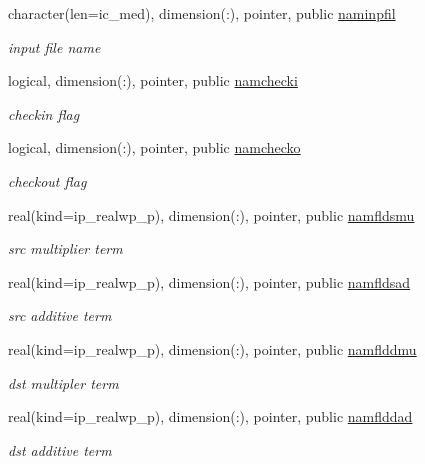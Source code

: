\begin{DoxyCompactItemize}
character(len=ic\+\_\+med), dimension(\+:), pointer, public \hyperlink{namespacemod__oasis__namcouple_a15fc11ff1c1d5718ff127a06a205a82c}{naminpfil}
\begin{DoxyCompactList}\small\item\em input file name \end{DoxyCompactList}\item 
logical, dimension(\+:), pointer, public \hyperlink{namespacemod__oasis__namcouple_a7c88a329c97aea020e9b135bdca8d160}{namchecki}
\begin{DoxyCompactList}\small\item\em checkin flag \end{DoxyCompactList}\item 
logical, dimension(\+:), pointer, public \hyperlink{namespacemod__oasis__namcouple_a58c011820e55c9af9f306fbb1d45eb23}{namchecko}
\begin{DoxyCompactList}\small\item\em checkout flag \end{DoxyCompactList}\item 
real(kind=ip\+\_\+realwp\+\_\+p), dimension(\+:), pointer, public \hyperlink{namespacemod__oasis__namcouple_ab52824ec91491253e02556a68ab31b09}{namfldsmu}
\begin{DoxyCompactList}\small\item\em src multiplier term \end{DoxyCompactList}\item 
real(kind=ip\+\_\+realwp\+\_\+p), dimension(\+:), pointer, public \hyperlink{namespacemod__oasis__namcouple_a1729dba99742412a1e07a479cb7f7921}{namfldsad}
\begin{DoxyCompactList}\small\item\em src additive term \end{DoxyCompactList}\item 
real(kind=ip\+\_\+realwp\+\_\+p), dimension(\+:), pointer, public \hyperlink{namespacemod__oasis__namcouple_ad81bb4f19a71f0fcf8655cb9d39a3380}{namflddmu}
\begin{DoxyCompactList}\small\item\em dst multipler term \end{DoxyCompactList}\item 
real(kind=ip\+\_\+realwp\+\_\+p), dimension(\+:), pointer, public \hyperlink{namespacemod__oasis__namcouple_af1e31f45ea1cd7a7b64a8a7dc2cec4ee}{namflddad}
\begin{DoxyCompactList}\small\item\em dst additive term \end{DoxyCompactList}\item 

\end{DoxyCompactItemize}
